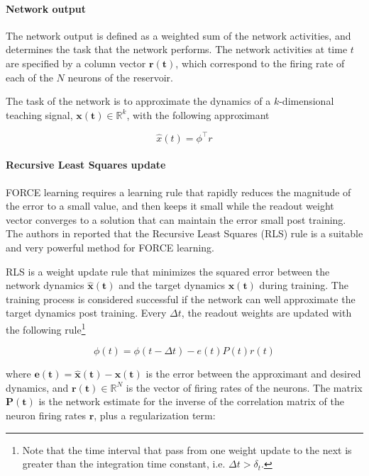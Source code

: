 \documentclass[10pt,a4paper, final]{report} %
\begin{document}
\paragraph{Network output}
The network output is defined as a weighted sum of the network activities, and determines the task that the network performs. The network activities at time $t$ are specified by a column vector $\bm{r(t)}$, which correspond to the firing rate of each of the $N$ neurons of the reservoir. 

The task of the network is to approximate the dynamics of a $k$-dimensional teaching signal, $\bm{x(t)} \in \mathbb{R}^k$, with the following approximant

\begin{equation}
\hat{x}(t) = \phi^\intercal r
\label{eq:network_output}
\end{equation}

\paragraph{Recursive Least Squares update}
FORCE learning requires a learning rule that rapidly reduces the magnitude of the error to a small value, and then keeps it small while the readout weight vector converges to a solution that can maintain the error small post training. The authors in \cite{sussillo2009generating} reported that the Recursive Least Squares (RLS) rule is a suitable and very powerful method for FORCE learning.

RLS is a weight update rule that minimizes the squared error between the
network dynamics $\bm{\hat{x}(t)}$ and the target dynamics $\bm{x(t)}$ during training. The training process is considered successful if the network can well approximate the target dynamics post training. Every $\Delta t$, the readout weights are updated with the following rule\footnote{Note that the time interval that pass from one weight update to the next is greater than the integration time constant, i.e. $\Delta t > \delta_t$.}

\begin{equation}
\phi(t) = \phi(t - \Delta t) - e(t) P(t) r(t)
\label{eq:RLS_readout_weights_update}
\end{equation}

where $\bm{e(t) = \hat{x}(t) - x(t)}$ is the error between the approximant and desired dynamics, and $\bm{r(t)} \in \mathbb{R}^N$ is the vector of firing rates of the neurons. The matrix $\bm{P(t)}$ is the network estimate for the inverse of the correlation matrix of the neuron firing rates $\bm{r}$, plus a regularization term:
\end{document}
